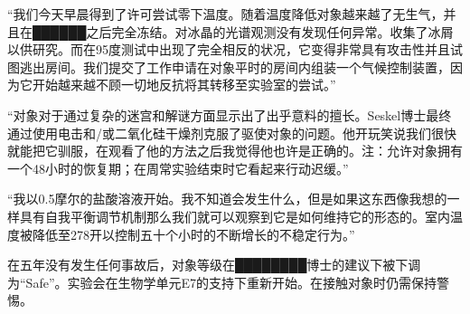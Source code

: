 \begin{scpbox}


“我们今天早晨得到了许可尝试零下温度。随着温度降低对象越来越了无生气，并且在██████之后完全冻结。对冰晶的光谱观测没有发现任何异常。收集了冰屑以供研究。而在95度测试中出现了完全相反的状况，它变得非常具有攻击性并且试图逃出房间。我们提交了工作申请在对象平时的房间内组装一个气候控制装置，因为它开始越来越不顾一切地反抗将其转移至实验室的尝试。”

\end{scpbox}

\begin{scpbox}


“对象对于通过复杂的迷宫和解谜方面显示出了出乎意料的擅长。Seskel博士最终通过使用电击和\slash 或二氧化硅干燥剂克服了驱使对象的问题。他开玩笑说我们很快就能把它驯服，在观看了他的方法之后我觉得他也许是正确的。注：允许对象拥有一个48小时的恢复期；在周常实验结束时它看起来行动迟缓。”

\end{scpbox}

\begin{scpbox}


“我以0.5摩尔的盐酸溶液开始。我不知道会发生什么，但是如果这东西像我想的一样具有自我平衡调节机制那么我们就可以观察到它是如何维持它的形态的。室内温度被降低至278开以控制五十个小时的不断增长的不稳定行为。”

\end{scpbox}

在五年没有发生任何事故后，对象等级在████████博士的建议下被下调为“Safe”。实验会在生物学单元E7的支持下重新开始。在接触对象时仍需保持警惕。
